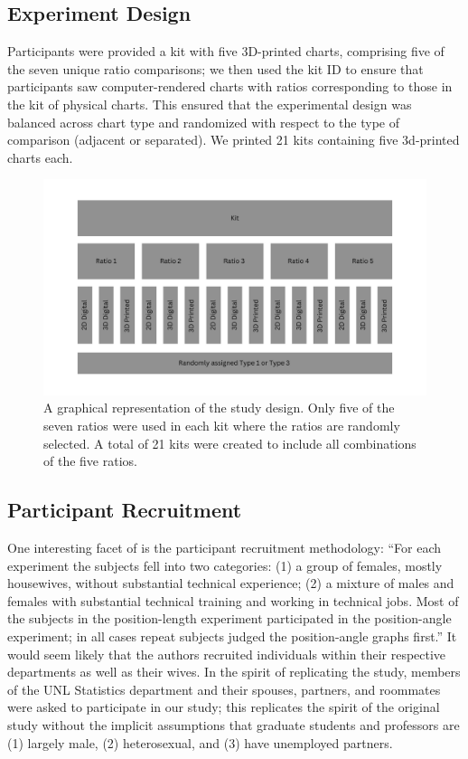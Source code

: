 \documentclass[letterpaper,inpress,dvipsnames]{jdsart}
\begin{document}
\hypertarget{experiment-design}{%
\subsection{Experiment Design}\label{experiment-design}}

Participants were provided a kit with five 3D-printed charts, comprising five of the seven unique ratio comparisons; we then used the kit ID to ensure that participants saw computer-rendered charts with ratios corresponding to those in the kit of physical charts.
This ensured that the experimental design was balanced across chart type and randomized with respect to the type of comparison (adjacent or separated).
We printed 21 kits containing five 3d-printed charts each.

\begin{figure}
\includegraphics[width=6.4in]{_images/study-design} \caption{A graphical representation of the study design. Only five of the seven ratios were used in each kit where the ratios are randomly selected. A total of 21 kits were created to include all combinations of the five ratios.}\label{fig:studyDesign}
\end{figure}

\hypertarget{participant-recruitment}{%
\subsection{Participant Recruitment}\label{participant-recruitment}}

One interesting facet of \citet{cleveland_graphical_1984} is the participant recruitment methodology: ``For each experiment the subjects fell into two categories: (1) a group of females, mostly housewives, without substantial technical experience; (2) a mixture of males and females with substantial technical training and working in technical jobs.
Most of the subjects in the position-length experiment participated in the position-angle experiment; in all cases repeat subjects judged the position-angle graphs first.''
It would seem likely that the authors recruited individuals within their respective departments as well as their wives.
In the spirit of replicating the study, members of the UNL Statistics department and their spouses, partners, and roommates were asked to participate in our study; this replicates the spirit of the original study without the implicit assumptions that graduate students and professors are (1) largely male, (2) heterosexual, and (3) have unemployed partners.
\end{document}
